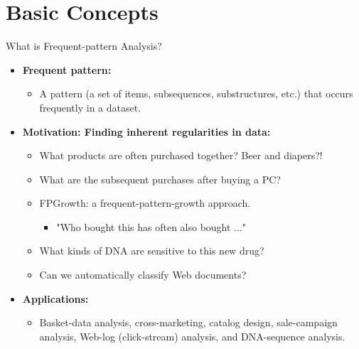 \section{Basic Concepts}

\begin{frame}{What is Frequent-pattern Analysis?}
	\begin{itemize}
		\item \textbf{Frequent pattern:}
		      \begin{itemize}
			      \item A pattern (a set of items, subsequences, substructures, etc.)
			            that occurs frequently in a dataset.
		      \end{itemize}
		\item \textbf{Motivation: Finding inherent regularities in data:}
		      \begin{itemize}
			      \item What products are often purchased together? Beer and diapers?!
			      \item What are the subsequent purchases after buying a PC?
			      \item FPGrowth: a frequent-pattern-growth approach.
			            \begin{itemize}
				            \item "Who bought this has often also bought $\ldots$"
			            \end{itemize}
			      \item What kinds of DNA are sensitive to this new drug?
			      \item Can we automatically classify Web documents?
		      \end{itemize}
		\item \textbf{Applications:}
		      \begin{itemize}
			      \item Basket-data analysis, cross-marketing, catalog design,
			            sale-campaign analysis, Web-log (click-stream) analysis, and
			            DNA-sequence analysis.
		      \end{itemize}
	\end{itemize}
\end{frame}


